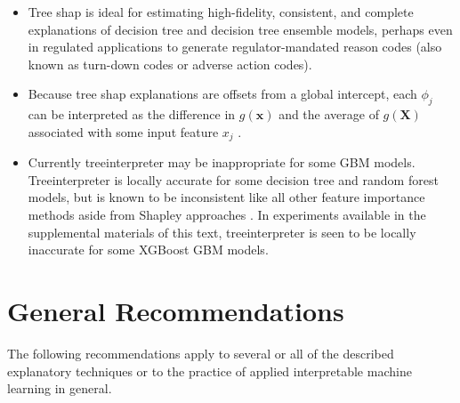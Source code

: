 \documentclass[11pt]{asaproc}
\begin{document}
\begin{itemize}
	
	\item Tree shap is ideal for estimating high-fidelity, consistent, and complete explanations of decision tree and decision tree ensemble models, perhaps even in regulated applications to generate regulator-mandated reason codes (also known as turn-down codes or adverse action codes).
	
	\item Because tree shap explanations are offsets from a global intercept, each $\phi_j$ can be interpreted as the difference in $g(\mathbf{x})$ and the average of $g(\mathbf{X})$ associated with some input feature $x_j$ \cite{molnar}. 
		
	\item Currently treeinterpreter may be inappropriate for some GBM models. Treeinterpreter is locally accurate for some decision tree and random forest models, but is known to be inconsistent like all other feature importance methods aside from Shapley approaches \cite{tree_shap}. In experiments available in the supplemental materials of this text, treeinterpreter is seen to be locally inaccurate for some XGBoost GBM models. 
	
\end{itemize}

\section{General Recommendations} \label{sec:gen_rec}

The following recommendations apply to several or all of the described explanatory techniques or to the practice of applied interpretable machine learning in general.
\end{document}
